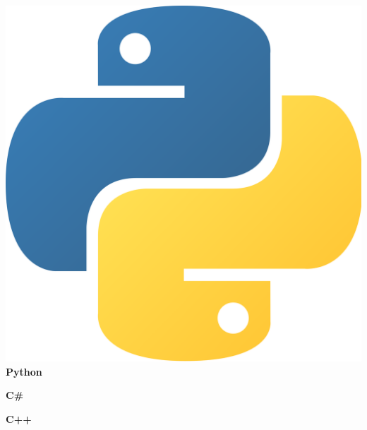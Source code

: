 \documentclass[a4paper]{./classes/friggeri-cv}
\begin{document}
\begin{aside}
        \includegraphics[scale=0.0045]{../assets/images/logos/Python_logo.png} \textbf{Python}%

        \textbf{C\#}%

        \textbf{C++}%


\end{aside}
\end{document}
